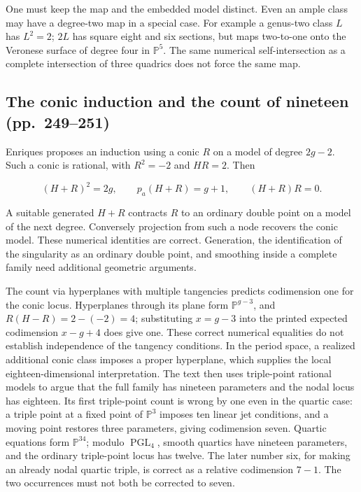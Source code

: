 One must keep the map and the embedded model distinct. Even an ample class may have a degree-two map in a special case. For example a genus-two class \(L\) has \(L^2=2\); \(2L\) has square eight and six sections, but maps two-to-one onto the Veronese surface of degree four in \(\mathbb P^5\). The same numerical self-intersection as a complete intersection of three quadrics does not force the same map.

\subsection{The conic induction and the count of nineteen (pp.~249--251)}\label{cp2-vii-2-3}

Enriques proposes an induction using a conic \(R\) on a model of degree \(2g-2\). Such a conic is rational, with \(R^2=-2\) and \(HR=2\). Then

\[
(H+R)^2=2g,\qquad p_a(H+R)=g+1,\qquad (H+R)R=0.
\]

A suitable generated \(H+R\) contracts \(R\) to an ordinary double point on a model of the next degree. Conversely projection from such a node recovers the conic model. These numerical identities are correct. Generation, the identification of the singularity as an ordinary double point, and smoothing inside a complete family need additional geometric arguments.

The count via hyperplanes with multiple tangencies predicts codimension one for the conic locus. Hyperplanes through its plane form \(\mathbb P^{g-3}\), and \(R(H-R)=2-(-2)=4\); substituting \(x=g-3\) into the printed expected codimension \(x-g+4\) does give one. These correct numerical equalities do not establish independence of the tangency conditions. In the period space, a realized additional conic class imposes a proper hyperplane, which supplies the local eighteen-dimensional interpretation. The text then uses triple-point rational models to argue that the full family has nineteen parameters and the nodal locus has eighteen. Its first triple-point count is wrong by one even in the quartic case: a triple point at a fixed point of \(\mathbb P^3\) imposes ten linear jet conditions, and a moving point restores three parameters, giving codimension seven. Quartic equations form \(\mathbb P^{34}\); modulo \(\operatorname{PGL}_4\), smooth quartics have nineteen parameters, and the ordinary triple-point locus has twelve. The later number six, for making an already nodal quartic triple, is correct as a relative codimension \(7-1\). The two occurrences must not both be corrected to seven.

